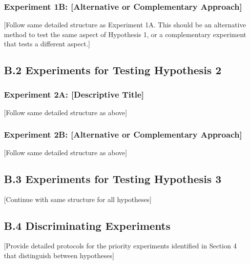 \documentclass[11pt,letterpaper]{article}
\begin{document}
\vspace{0.5cm}

\subsubsection*{Experiment 1B: [Alternative or Complementary Approach]}

[Follow same detailed structure as Experiment 1A. This should be an alternative method to test the same aspect of Hypothesis 1, or a complementary experiment that tests a different aspect.]

\vspace{0.5cm}

\subsection*{B.2 Experiments for Testing Hypothesis 2}

\subsubsection*{Experiment 2A: [Descriptive Title]}

[Follow same detailed structure as above]

\subsubsection*{Experiment 2B: [Alternative or Complementary Approach]}

[Follow same detailed structure as above]

\vspace{0.5cm}

\subsection*{B.3 Experiments for Testing Hypothesis 3}

[Continue with same structure for all hypotheses]

\vspace{0.5cm}

\subsection*{B.4 Discriminating Experiments}

[Provide detailed protocols for the priority experiments identified in Section 4 that distinguish between hypotheses]

\newpage
{}
\end{document}
